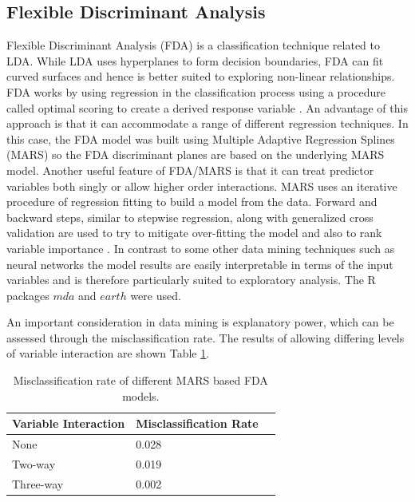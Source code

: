 \documentclass[a4paper, 12pt]{report}
\begin{document}
\subsection*{Flexible Discriminant Analysis}
Flexible Discriminant Analysis (\gls{FDA}) is a classification technique related to \gls{LDA}. While LDA uses hyperplanes to form decision boundaries, FDA can fit curved surfaces and hence is better suited to exploring non-linear relationships. FDA works by using regression in the classification process using a procedure called optimal scoring to create a derived response variable \cite{earth}. An advantage of this approach is that it can accommodate a range of different regression techniques. In this case, the FDA model was built using Multiple Adaptive Regression Splines (\gls{MARS}) so the FDA discriminant planes are based on the underlying MARS model. Another useful feature of FDA/MARS is that it can treat predictor variables both singly or allow higher order interactions. MARS uses an iterative procedure of regression fitting to build a model from the data. Forward and backward steps, similar to stepwise regression, along with generalized cross validation are used to try to mitigate over-fitting the model \cite{EOSL} and also to rank variable importance \cite{earth}. In contrast to some other data mining techniques such as neural networks the model results are easily interpretable in terms of the input variables and is therefore particularly suited to exploratory analysis. The R packages $mda$ \cite{mda} and $earth$ \cite{earth} were used.

An important consideration in data mining is explanatory power, which can be assessed through the misclassification rate. The results of allowing differing levels of variable interaction are shown Table \ref{T:MARSFIT}.

\begin{table}[h]
\centering
\begin{tabular}{lll}
  \hline
Variable Interaction & Misclassification Rate \\ 
  \hline
None &  0.028 \\ 
Two-way &  0.019 \\ 
Three-way & 0.002 \\
   \hline
\end{tabular}
\caption{Misclassification rate of different MARS based FDA models.} 
\label{T:MARSFIT}
\end{table}

\end{document}
